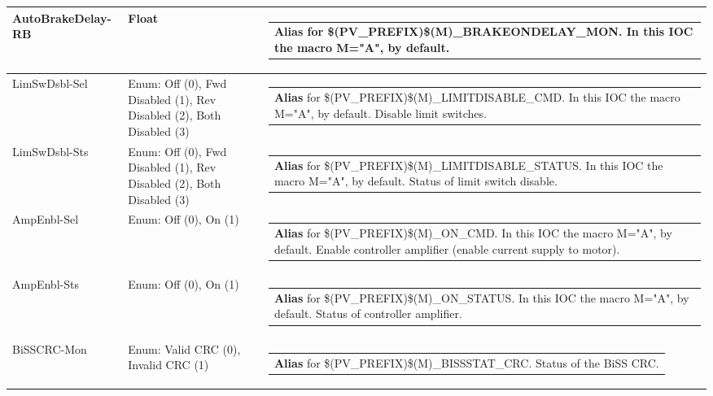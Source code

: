 \documentclass[openany]{article}
\begin{document}
\begin{longtable}{| m{4.5cm} m{2.5cm}  m{8.5cm} |}
        AutoBrakeDelay-RB & Float & \begin{tabular}{@{}m{6cm}@{}}
                \textbf{\color{blue} Alias} for \$(PV\_PREFIX)\$(M)\_BRAKEONDELAY\_MON. In this IOC the macro M="A", by default.
            \end{tabular} \hypertarget{pv:lim-sw-dsbl}{}\\ \hline
        LimSwDsbl-Sel & Enum: Off (0), Fwd Disabled (1), Rev Disabled (2), Both Disabled (3) & \begin{tabular}{@{}m{6cm}@{}}
                \textbf{\color{blue} Alias} for \$(PV\_PREFIX)\$(M)\_LIMITDISABLE\_CMD. In this IOC the macro M="A", by default. Disable limit switches.
            \end{tabular} \hypertarget{}{}\\ \hline
        LimSwDsbl-Sts & Enum: Off (0), Fwd Disabled (1), Rev Disabled (2), Both Disabled (3) & \begin{tabular}{@{}m{6cm}@{}}
                \textbf{\color{blue} Alias} for \$(PV\_PREFIX)\$(M)\_LIMITDISABLE\_STATUS. In this IOC the macro M="A", by default. Status of limit switch disable.
            \end{tabular} \hypertarget{pv:amp-enbl}{}\\ \hline
        AmpEnbl-Sel & Enum: Off (0), On (1) & \begin{tabular}{@{}m{6cm}@{}}
                \textbf{\color{blue} Alias} for \$(PV\_PREFIX)\$(M)\_ON\_CMD. In this IOC the macro M="A", by default. Enable controller amplifier (enable current supply to motor).
            \end{tabular} \hypertarget{}{}\\ \hline
        AmpEnbl-Sts & Enum: Off (0), On (1) & \begin{tabular}{@{}m{6cm}@{}}
                \textbf{\color{blue} Alias} for \$(PV\_PREFIX)\$(M)\_ON\_STATUS. In this IOC the macro M="A", by default. Status of controller amplifier.
            \end{tabular} \hypertarget{pv:biss-crc-mon}{}\\ \hline
        BiSSCRC-Mon & Enum: Valid CRC (0), Invalid CRC (1) & \begin{tabular}{@{}m{6cm}@{}}
                \textbf{\color{blue} Alias} for \$(PV\_PREFIX)\$(M)\_BISSSTAT\_CRC. Status of the BiSS CRC.
            \end{tabular} \hypertarget{pv:biss-err-mon}{}\\ \hline

\end{longtable}
\end{document}
